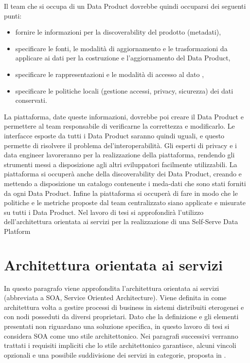 \documentclass[12pt]{report}
\begin{document}
Il team che si occupa di un Data Product dovrebbe quindi occuparsi dei seguenti punti:
\begin{itemize}
    \item fornire le informazioni per la discoverability del prodotto (metadati),
    \item specificare le fonti, le modalità di aggiornamento e le trasformazioni da applicare ai dati per la costruzione e l'aggiornamento del Data Product,
    \item specificare le rappresentazioni e le modalità di accesso al dato ,
    \item specificare le politiche locali (gestione accessi, privacy, sicurezza) dei dati conservati.
\end{itemize}
La piattaforma, date queste informazioni, dovrebbe poi creare il Data Product e permettere al team responsabile di verificarne la correttezza e modificarlo. 
Le interfacce esposte da tutti i Data Product saranno quindi uguali, e questo permette di risolvere il problema del'interoperabilità.
Gli esperti di privacy e i data engineer lavoreranno per la realizzazione della piattaforma, rendendo gli strumenti messi a disposizione agli altri sviluppatori facilmente utilizzabili.
La piattaforma si occuperà anche della discoverability dei Data Product, creando e mettendo a disposizione un catalogo contenente i meda-dati che sono stati forniti da ogni Data Product.
Infine la piattaforma si occuperà di fare in modo che le politiche e le metriche proposte dal team centralizzato siano applicate e misurate su tutti i Data Product.
Nel lavoro di tesi si approfondirà l'utilizzo dell'architettura orientata ai servizi per la realizzazione di una Self-Serve Data Platform





\section{Architettura orientata ai servizi} \label{servizio}
In questo paragrafo viene approfondita l'architettura orientata ai servizi (abbreviata a SOA, Service Oriented Architecture).
Viene definita in \cite{josuttis_soa_2007} come architettura volta a gestire processi di business in sistemi distribuiti eterogenei e con nodi posseduti da diversi proprietari.
Dato che la definizione e gli elementi presentati non riguardano una soluzione specifica, in questo lavoro di tesi si considera SOA come uno stile architettonico.
Nei paragrafi successivi verranno trattati i requisiti impliciti che lo stile architettonico garantisce, alcuni vincoli opzionali e una possibile suddivisione dei servizi in categorie, proposta in \cite {josuttis_soa_2007}.
\end{document}
